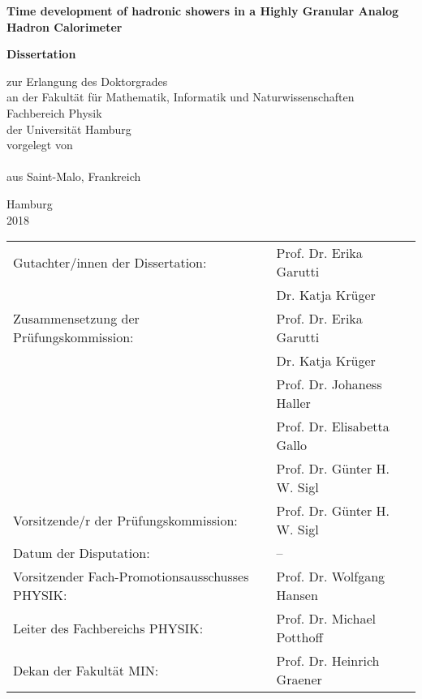 \begin{titlepage}

  \thispagestyle{empty}
  \begin{center}

    {\huge \bf Time development of hadronic showers in a Highly Granular Analog Hadron Calorimeter\\}

    \vspace{3cm}

    {\LARGE \bf Dissertation\\}

    \vspace{0.5cm}
    {\Large
    zur Erlangung des Doktorgrades\\
    an der Fakult\"{a}t f\"ur Mathematik, Informatik und Naturwissenschaften\\
    Fachbereich Physik\\
    der Universit\"{a}t Hamburg\\
    \vspace{2.5cm}
    vorgelegt von\\
    \makeatletter
    \textsc{\@author}\\
    \makeatother
    aus Saint-Malo, Frankreich\\

    \vfill

    Hamburg\\
    2018\\
    }

    \newpage
    \thispagestyle{empty}
    \null
    \vfill
    \begin{tabular}{ll}
      Gutachter/innen der Dissertation: & Prof. Dr. Erika Garutti\\
      & Dr. Katja Kr\"uger\\[3mm]
      Zusammensetzung der Pr\"ufungskommission: & Prof. Dr. Erika Garutti\\
      & Dr. Katja Kr\"uger\\
      & Prof. Dr. Johaness Haller\\
      & Prof. Dr. Elisabetta Gallo\\
      & Prof. Dr. G\"unter H. W. Sigl\\[3mm]
      Vorsitzende/r der Pr\"ufungskommission: & Prof. Dr. G\"unter H. W. Sigl\\[3mm]
      Datum der Disputation: & --\\[3mm]
      Vorsitzender Fach-Promotionsausschusses PHYSIK: & Prof. Dr. Wolfgang Hansen\\[3mm]
      Leiter des Fachbereichs PHYSIK: & Prof. Dr. Michael Potthoff\\[3mm]
      Dekan der Fakult\"at MIN: & Prof. Dr. Heinrich Graener\\[3mm]
    \end{tabular}

  \end{center}
\end{titlepage}

